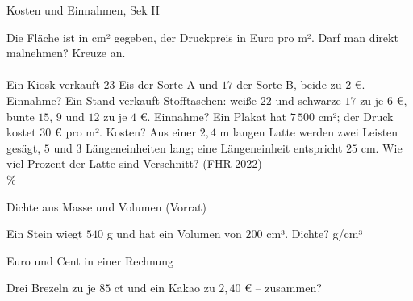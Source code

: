 \begin{aufgabe}{Kosten und Einnahmen, Sek II}
\begin{teile}
\teil Die Fläche ist in cm² gegeben, der Druckpreis in Euro pro m². Darf man direkt malnehmen? Kreuze an.\\ \\ 
\teil Ein Kiosk verkauft $23$ Eis der Sorte A und $17$ der Sorte B, beide zu $2$ €. Einnahme? \leerfeld[€]
\teil Ein Stand verkauft Stofftaschen: weiße $22$ und schwarze $17$ zu je $6$ €, bunte $15$, $9$ und $12$ zu je $4$ €. Einnahme? \leerfeld[€]
\teil Ein Plakat hat $7\,500$ cm²; der Druck kostet $30$ € pro m². Kosten? \leerfeld[€]
\teil Aus einer $2{,}4$ m langen Latte werden zwei Leisten gesägt, $5$ und $3$ Längeneinheiten lang; eine Längeneinheit entspricht $25$ cm. Wie viel Prozent der Latte sind Verschnitt? \hfill (FHR 2022) \\ \leerfeld \%
\end{teile}
\end{aufgabe}

\begin{aufgabe}{Dichte aus Masse und Volumen (Vorrat)}
\begin{teile}
\teil Ein Stein wiegt $540$ g und hat ein Volumen von $200$ cm³. Dichte? \leerfeld g/cm³
\end{teile}
\end{aufgabe}

\begin{aufgabe}{Euro und Cent in einer Rechnung}
\begin{teile}
\teil Drei Brezeln zu je $85$ ct und ein Kakao zu $2{,}40$ € – zusammen? \leerfeld[€]
\end{teile}
\end{aufgabe}

